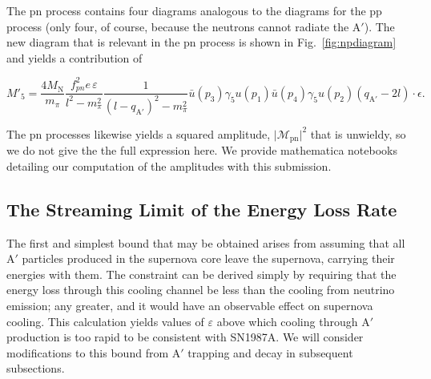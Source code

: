 \documentclass[nofootinbib,prd,superscriptaddress,twocolumn]{revtex4}
\newcommand{\qa}{q_{\mathrm{A}'}}
\newcommand{\Aprime}{\mathrm{A}'}
\begin{document}
The pn process contains four diagrams analogous to the diagrams for the pp process (only four, of course, 
because the neutrons cannot radiate the $\Aprime$). The new diagram that is relevant in the pn process is shown in 
Fig.~\ref{fig:npdiagram} and yields a contribution of 
%
\begin{widetext}
\begin{equation}
M'_5 = \frac{4 M_{\mathrm N}}{ m_\pi} \frac{f_{pn}^2 e\, \varepsilon}{l^2-m_\pi^2}  \frac{1}{(l-\qa)^2 - m_\pi^2} 
\bar{u}(p_3) \gamma_5 u(p_1) \bar{u}(p_4) \gamma_5 u(p_2) (\qa - 2l)\cdot \epsilon.
\end{equation}
\end{widetext}
%
The pn processes likewise yields a squared amplitude, 
$\vert \mathcal{M}_{\mathrm{pn}} \vert^2$ that is unwieldy, so we do not give the 
the full expression here. We provide mathematica notebooks detailing our 
computation of the amplitudes with this submission.


\subsection{The Streaming Limit of the Energy Loss Rate}

The first and simplest bound that may be obtained arises from 
assuming that all $\Aprime$ particles produced in the supernova core 
leave the supernova, carrying their energies with them. The constraint can be derived simply by 
requiring that the energy loss through this cooling channel be less than the cooling from neutrino emission; 
any greater, and it would have an observable effect on supernova cooling. This calculation yields values of 
$\varepsilon$ above which cooling through $\Aprime$ production is too rapid to be consistent with SN1987A. 
We will consider modifications to this bound from $\Aprime$ trapping and decay in subsequent subsections.
\end{document}
